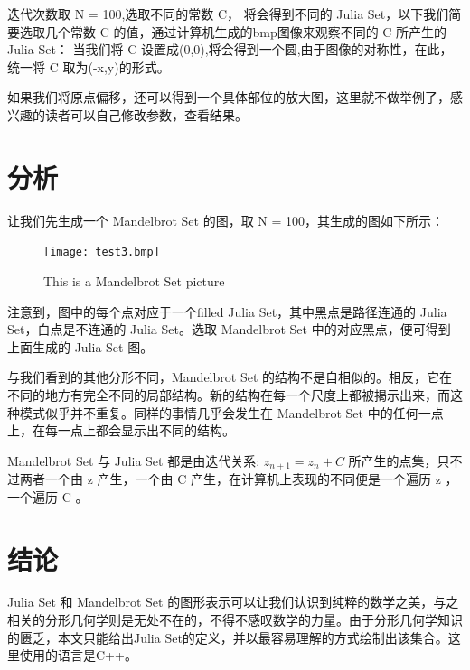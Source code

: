 \documentclass{ctexart}
\begin{document}
迭代次数取 N = 100,选取不同的常数 C， 将会得到不同的 Julia Set，以下我们简要选取几个常数 C 的值，通过计算机生成的bmp图像来观察不同的 C 所产生的 Julia Set：
当我们将 C 设置成(0,0),将会得到一个圆,由于图像的对称性，在此，统一将 C 取为(-x,y)的形式。
\begin{figure}[H]
\centering
{}
\end{figure}

\begin{figure}[H]
\centering
{}
\end{figure}

如果我们将原点偏移，还可以得到一个具体部位的放大图，这里就不做举例了，感兴趣的读者可以自己修改参数，查看结果。

\section{分析}

让我们先生成一个 Mandelbrot Set 的图，取 N = 100，其生成的图如下所示：
\begin{figure}[H]
  \centering
  \texttt{[image: test3.bmp]}
  \caption{This is a Mandelbrot Set picture}
\end{figure}
注意到，图中的每个点对应于一个filled Julia Set，其中黑点是路径连通的 Julia Set，白点是不连通的 Julia Set。选取 Mandelbrot Set 中的对应黑点，便可得到上面生成的 Julia Set 图。

与我们看到的其他分形不同，Mandelbrot Set 的结构不是自相似的。相反，它在不同的地方有完全不同的局部结构。新的结构在每一个尺度上都被揭示出来，而这种模式似乎并不重复。同样的事情几乎会发生在 Mandelbrot Set 中的任何一点上，在每一点上都会显示出不同的结构。

Mandelbrot Set 与 Julia Set 都是由迭代关系: $z_{n+1} = z_n + C$ 所产生的点集，只不过两者一个由 z 产生，一个由 C 产生，在计算机上表现的不同便是一个遍历 z ，一个遍历 C 。

\section{结论}

Julia Set 和 Mandelbrot Set 的图形表示可以让我们认识到纯粹的数学之美，与之相关的分形几何学则是无处不在的，不得不感叹数学的力量。由于分形几何学知识的匮乏，本文只能给出Julia Set的定义，并以最容易理解的方式绘制出该集合。这里使用的语言是C++。 \cite{王伊蕾2015LaTeX}



\end{document}
